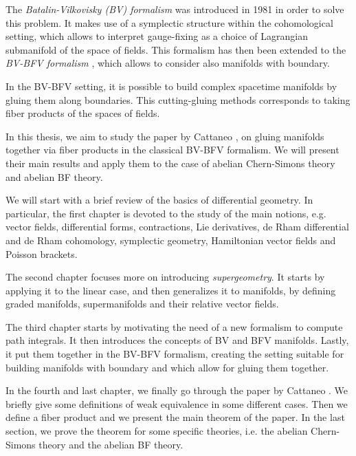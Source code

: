 The \emph{Batalin-Vilkovisky (BV) formalism} \cite{BV_1, BV_2} was introduced in 1981 in order to solve this problem.
It makes use of a symplectic structure within the cohomological setting, which allows to interpret gauge-fixing as a choice of Lagrangian submanifold of the space of fields.
This formalism has then been extended to the \emph{BV-BFV formalism} \cite{Mnfd_boundaries, mCME, Intro_BV-BFV}, which allows to consider also manifolds with boundary.

In the BV-BFV setting, it is possible to build complex spacetime manifolds by gluing them along boundaries.
This cutting-gluing methods corresponds to taking fiber products of the spaces of fields.


In this thesis, we aim to study the paper by Cattaneo \etal \cite{Gluing_BV-BFV}, on gluing manifolds together via fiber products in the classical BV-BFV formalism.
We will present their main results and apply them to the case of abelian Chern-Simons theory and abelian BF theory.



We will start with a brief review of the basics of differential geometry.
In particular, the first chapter is devoted to the study of the main notions, e.g. vector fields, differential forms, contractions, Lie derivatives, de Rham differential and de Rham cohomology, symplectic geometry, Hamiltonian vector fields and Poisson brackets.

The second chapter focuses more on introducing \emph{supergeometry}.
It starts by applying it to the linear case, and then generalizes it to manifolds, by defining graded manifolds, supermanifolds and their relative vector fields.

The third chapter starts by motivating the need of a new formalism to compute path integrals.
It then introduces the concepts of BV and BFV manifolds.
Lastly, it put them together in the BV-BFV formalism, creating the setting suitable for building manifolds with boundary and which allow for gluing them together.

In the fourth and last chapter, we finally go through the paper by Cattaneo \etal \cite{Gluing_BV-BFV}.
We briefly give some definitions of weak equivalence in some different cases.
Then we define a fiber product and we present the main theorem of the paper.
In the last section, we prove the theorem for some specific theories, i.e. the abelian Chern-Simons theory and the abelian BF theory.